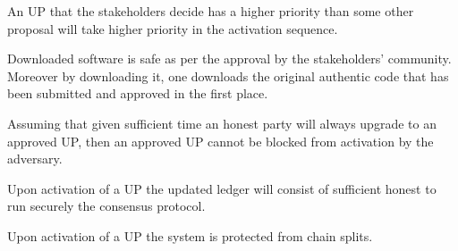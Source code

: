 \begin{property}\label{prop:activation-priorities}
  An UP that the stakeholders decide has a higher priority than some other
  proposal will take higher priority in the activation sequence.
\end{property}

\begin{property}\label{prop:auth-safety}
  Downloaded software is safe as per the approval by the stakeholders'
  community. Moreover by downloading it, one downloads the original authentic
  code that has been submitted and approved in the first place.
\end{property}

\begin{property}\label{prop:doactivation}
  Assuming that given sufficient time an honest party will always upgrade to an
  approved UP, then an approved UP cannot be blocked from activation by the
  adversary.
\end{property}

\begin{property}\label{prop:honest-majority}
  Upon activation of a UP the updated ledger will consist of sufficient honest
  to run securely the consensus protocol.
\end{property}

\begin{property}\label{prop:chain-split}
  Upon activation of a UP the system is protected from chain splits.
\end{property}


%
%

